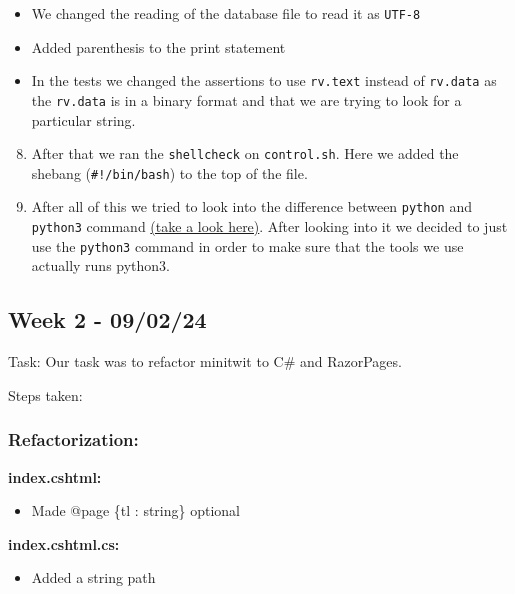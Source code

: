\begin{itemize}
    \item We changed the reading of the database file to read it as \texttt{UTF-8}
    \item Added parenthesis to the print statement
    \item In the tests we changed the assertions to use \texttt{rv.text} instead of \texttt{rv.data} as the \texttt{rv.data} is in a binary format and that we are trying to look for a particular string.
\end{itemize}

\begin{enumerate}
\setcounter{enumi}{7}
    \item After that we ran the \texttt{shellcheck} on \texttt{control.sh}. Here we added the shebang (\texttt{\#!/bin/bash}) to the top of the file.
    \item After all of this we tried to look into the difference between \texttt{python} and \texttt{python3} command \href{https://stackoverflow.com/questions/64801225/python-or-python3-what-is-the-difference}{(take a look here)}. After looking into it we decided to just use the \texttt{python3} command in order to make sure that the tools we use actually runs python3.
\end{enumerate}

\subsection{Week 2 - 09/02/24}
\label{log:week2}

Task: Our task was to refactor minitwit to C\# and RazorPages.

Steps taken:

\subsubsection{Refactorization:}
\label{log:refactorization}

\textbf{index.cshtml:}

\begin{itemize}
    \item Made @page \{tl : string\} optional
\end{itemize}

\textbf{index.cshtml.cs:}

\begin{itemize}
    \item Added a string path
\end{itemize}

